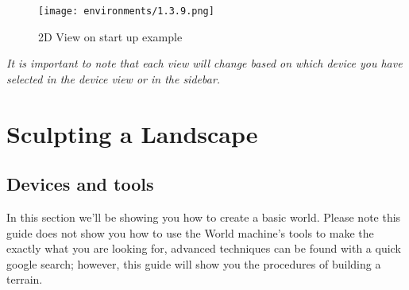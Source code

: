 \documentclass[../main.tex]{subfiles}
\begin{document}
\begin{figure}[H]
\texttt{[image: environments/1.3.9.png]}
\caption{2D View on start up example}
\end{figure}
\textit{It is important to note that each view will change based on which device you have selected in the device view or in the sidebar.}

\section{Sculpting a Landscape}
\subsection{Devices and tools}
In this section we’ll be showing you how to create a basic world. Please note this guide does not show you how to use the World machine’s tools to make the exactly what you are looking for, advanced techniques can be found with a quick google search; however, this guide will show you the procedures of building a terrain.
\end{document}
